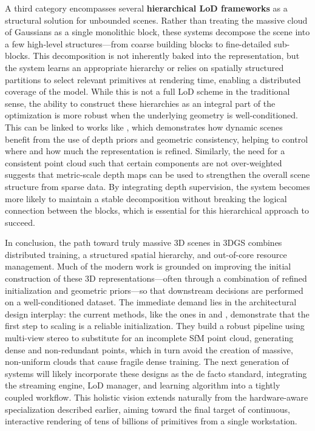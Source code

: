 \documentclass[11pt,a4paper]{article}
\begin{document}
A third category encompasses several \textbf{hierarchical LoD frameworks} as a structural solution for unbounded scenes. Rather than treating the massive cloud of Gaussians as a single monolithic block, these systems decompose the scene into a few high-level structures---from coarse building blocks to fine-detailed sub-blocks. This decomposition is not inherently baked into the representation, but the system learns an appropriate hierarchy or relies on spatially structured partitions to select relevant primitives at rendering time, enabling a distributed coverage of the model. While this is not a full LoD scheme in the traditional sense, the ability to construct these hierarchies as an integral part of the optimization is more robust when the underlying geometry is well-conditioned. This can be linked to works like \cite{arxiv:2608.01588v1}, which demonstrates how dynamic scenes benefit from the use of depth priors and geometric consistency, helping to control where and how much the representation is refined. Similarly, the need for a consistent point cloud such that certain components are not over-weighted \cite{arxiv:2510.12099v2} suggests that metric-scale depth maps can be used to strengthen the overall scene structure from sparse data. By integrating depth supervision, the system becomes more likely to maintain a stable decomposition without breaking the logical connection between the blocks, which is essential for this hierarchical approach to succeed.

In conclusion, the path toward truly massive 3D scenes in 3DGS combines distributed training, a structured spatial hierarchy, and out-of-core resource management. Much of the modern work is grounded on improving the initial construction of these 3D representations---often through a combination of refined initialization and geometric priors---so that downstream decisions are performed on a well-conditioned dataset. The immediate demand lies in the architectural design interplay: the current methods, like the ones in \cite{arxiv:2509.23258v2} and \cite{arxiv:2510.17479v1}, demonstrate that the first step to scaling is a reliable initialization. They build a robust pipeline using multi-view stereo to substitute for an incomplete SfM point cloud, generating dense and non-redundant points, which in turn avoid the creation of massive, non-uniform clouds that cause fragile dense training. The next generation of systems will likely incorporate these designs as the de facto standard, integrating the streaming engine, LoD manager, and learning algorithm into a tightly coupled workflow. This holistic vision extends naturally from the hardware-aware specialization described earlier, aiming toward the final target of continuous, interactive rendering of tens of billions of primitives from a single workstation.
\end{document}
